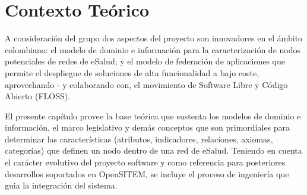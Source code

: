 \chapter{Contexto Teórico}

A consideración del grupo dos aspectos del proyecto son innovadores en el ámbito colombiano: el modelo de dominio e información para la caracterización de nodos potenciales de redes de eSalud; y el modelo de federación de aplicaciones que permite el despliegue de soluciones de alta funcionalidad a bajo coste, aprovechando - y colaborando con, el movimiento de Software Libre y Código Abierto (FLOSS).

El presente capítulo provee la base teórica que sustenta los modelos de dominio e información, el marco legislativo y demás conceptos que son primordiales para determinar las características (atributos, indicadores, relaciones, axiomas, categorías) que definen un nodo dentro de una red de eSalud. Teniendo en cuenta el carácter evolutivo del proyecto software y como referencia para posteriores desarrollos soportados en  OpenSITEM, se incluye el proceso de ingeniería que guia la integración del sistema.




